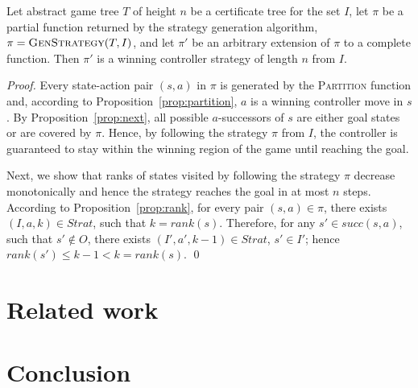 \begin{theorem}
Let abstract game tree $T$ of height $n$ be a certificate tree for
the set $I$, let $\pi$ be a partial function returned by the
strategy generation algorithm, $\pi=\textsc{GenStrategy}(T,I)$,
and let $\pi'$ be an arbitrary extension of $\pi$ to a complete
function.  Then $\pi'$ is a winning controller strategy of length
$n$ from $I$.
\end{theorem}
\begin{proof}
Every state-action pair $(s, a)$ in $\pi$ is generated by the
\textsc{Partition} function and, according to
Proposition~\ref{prop:partition}, $a$ is a winning controller move
in $s$. By Proposition~\ref{prop:next}, all possible
$a$-successors of $s$ are either goal states or are covered by
$\pi$.  Hence, by following the strategy $\pi$ from $I$, the
controller is guaranteed to stay within the winning region of the
game until reaching the goal.

Next, we show that ranks of states visited by following the
strategy $\pi$ decrease monotonically and hence the strategy
reaches the goal in at most $n$ steps. According to
Proposition~\ref{prop:rank}, for every pair $(s,a) \in \pi$, there
exists $(I, a, k)\in Strat$, such that $k=rank(s)$.  Therefore,
for any $s'\in succ(s,a)$, such that $s'\not\in O$, there exists
$(I', a', k-1)\in Strat$, $s'\in I'$; hence $rank(s')\leq k-1 < k
= rank(s)$.
\qed
\end{proof}

\section{Related work}

\section{Conclusion}
